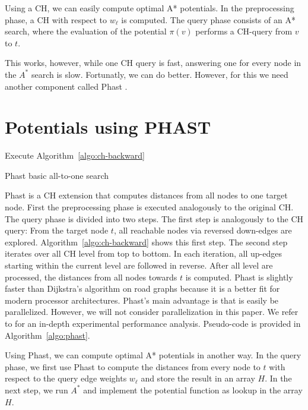 \documentclass[a4paper,UKenglish,cleveref, autoref]{lipics-v2019}
\begin{document}
Using a CH, we can easily compute optimal A* potentials.
In the preprocessing phase, a CH with respect to $w_\ell$ is computed.
The query phase consists of an A* search, where the evaluation of the potential $\pi(v)$ performs a CH-query from $v$ to $t$.

This works, however, while one CH query is fast, answering one for every node in the $A^*$ search is slow.
Fortunatly, we can do better.
However, for this we need another component called Phast \cite{Phast}.

\section{Potentials using PHAST}

\begin{algorithm2e}
Execute Algorithm~\ref{algo:ch-backward}\;
\caption{Phast basic all-to-one search}
\label{algo:phast}
\end{algorithm2e}

Phast \cite{Phast} is a CH extension that computes distances from all nodes to one target node.
First the preprocessing phase is executed analogously to the original CH.
The query phase is divided into two steps.
The first step is analogously to the CH query:
From the target node $t$, all reachable nodes via reversed down-edges are explored.
Algorithm~\ref{algo:ch-backward} shows this first step.
The second step iterates over all CH level from top to bottom.
In each iteration, all up-edges starting within the current level are followed in reverse.
After all level are processed, the distances from all nodes towards $t$ is computed.
Phast is slightly faster than Dijkstra's algorithm on road graphs because it is a better fit for modern processor architectures.
Phast's main advantage is that is easily be parallelized.
However, we will not consider parallelization in this paper.
We refer to \cite{Phast} for an in-depth experimental performance analysis.
Pseudo-code is provided in Algorithm~\ref{algo:phast}.

Using Phast, we can compute optimal A* potentials in another way.
In the query phase, we first use Phast to compute the distances from every node to $t$ with respect to the query edge weights $w_\ell$ and store the result in an array $H$.
In the next step, we run $A^*$ and implement the potential function as lookup in the array $H$.
\end{document}
